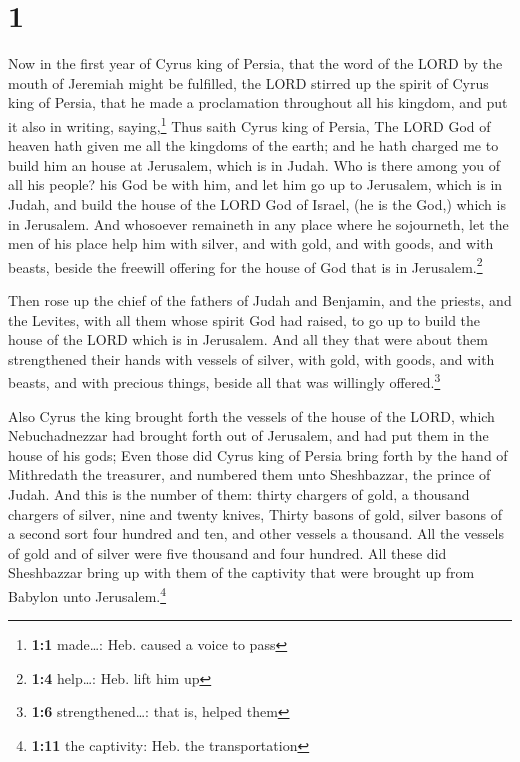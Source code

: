 \hypertarget{section}{%
\section{1}\label{section}}

 Now in the first year of Cyrus king of Persia, that the
word of the LORD by the mouth of Jeremiah might be fulfilled, the LORD
stirred up the spirit of Cyrus king of Persia, that he made a
proclamation throughout all his kingdom, and put it also in writing,
saying,\footnote{\textbf{1:1} made\ldots: Heb. caused a voice to pass}
 Thus saith Cyrus king of Persia, The LORD God of heaven
hath given me all the kingdoms of the earth; and he hath charged me to
build him an house at Jerusalem, which is in Judah.  Who
is there among you of all his people? his God be with him, and let him
go up to Jerusalem, which is in Judah, and build the house of the LORD
God of Israel, (he is the God,) which is in Jerusalem. 
And whosoever remaineth in any place where he sojourneth, let the men of
his place help him with silver, and with gold, and with goods, and with
beasts, beside the freewill offering for the house of God that is in
Jerusalem.\footnote{\textbf{1:4} help\ldots: Heb. lift him up}

 Then rose up the chief of the fathers of Judah and
Benjamin, and the priests, and the Levites, with all them whose spirit
God had raised, to go up to build the house of the LORD which is in
Jerusalem.  And all they that were about them strengthened
their hands with vessels of silver, with gold, with goods, and with
beasts, and with precious things, beside all that was willingly
offered.\footnote{\textbf{1:6} strengthened\ldots: that is, helped them}

 Also Cyrus the king brought forth the vessels of the
house of the LORD, which Nebuchadnezzar had brought forth out of
Jerusalem, and had put them in the house of his gods; 
Even those did Cyrus king of Persia bring forth by the hand of
Mithredath the treasurer, and numbered them unto Sheshbazzar, the prince
of Judah.  And this is the number of them: thirty chargers
of gold, a thousand chargers of silver, nine and twenty knives,
 Thirty basons of gold, silver basons of a second sort
four hundred and ten, and other vessels a thousand.  All
the vessels of gold and of silver were five thousand and four hundred.
All these did Sheshbazzar bring up with them of the captivity that were
brought up from Babylon unto Jerusalem.\footnote{\textbf{1:11} the
  captivity: Heb. the transportation}

